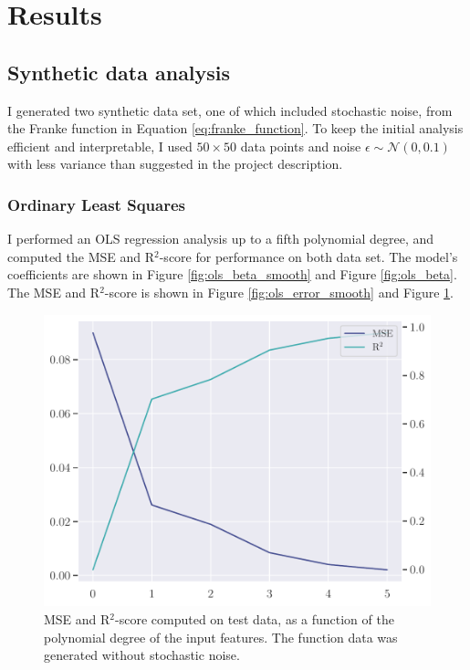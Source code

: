 \section{Results}\label{sec:results}
\subsection{Synthetic data analysis}\label{ssec:synthetic_data}
I generated two synthetic data set, one of which included stochastic noise, from the Franke function in Equation \eqref{eq:franke_function}. To keep the initial analysis efficient and interpretable, I used $50 \times 50$ data points and noise $\epsilon \sim \mathcal{N}(0, 0.1)$ with less variance than suggested in the project description. 

\subsubsection{Ordinary Least Squares}\label{sssec:ols}
I performed an OLS regression analysis up to a fifth polynomial degree, and computed the MSE and R$^{2}$-score for performance on both data set. The model's coefficients are shown in Figure \ref{fig:ols_beta_smooth} and Figure \ref{fig:ols_beta}. The MSE and R$^{2}$-score is shown in Figure \ref{fig:ols_error_smooth} and Figure \ref{fig:ols_error}.

\begin{figure}
    \centering
    \includegraphics[width=0.9\linewidth]{project-1/latex/figures/ols_error.pdf}
    \caption{MSE and R$^{2}$-score computed on test data, as a function of the polynomial degree of the input features. The function data was generated without stochastic noise.}
    \label{fig:ols_error}
\end{figure}

